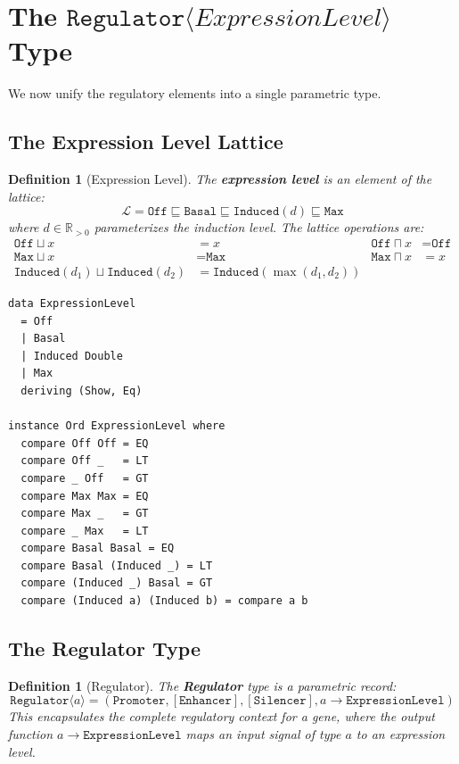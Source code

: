 \documentclass[12pt,a4paper]{article}
\newtheorem{definition}[theorem]{Definition}
\newcommand{\ExprLevel}{\texttt{ExpressionLevel}}
\newcommand{\Reg}[1]{\texttt{Regulator}\ensuremath{\langle}#1\ensuremath{\rangle}}
\begin{document}
\section{The \texorpdfstring{$\Reg{ExpressionLevel}$}{Regulator<ExpressionLevel>} Type}\label{sec:regulator-type}

We now unify the regulatory elements into a single parametric type.

\subsection{The Expression Level Lattice}

\begin{definition}[Expression Level]\label{def:expression-level}
The \textbf{expression level} is an element of the lattice:
\[
\mathcal{L} = \texttt{Off} \sqsubseteq \texttt{Basal} \sqsubseteq \texttt{Induced}(d) \sqsubseteq \texttt{Max}
\]
where $d \in \mathbb{R}_{>0}$ parameterizes the induction level.  The lattice operations are:
\begin{align}
\texttt{Off} \sqcup x &= x & \texttt{Off} \sqcap x &= \texttt{Off} \\
\texttt{Max} \sqcup x &= \texttt{Max} & \texttt{Max} \sqcap x &= x \\
\texttt{Induced}(d_1) \sqcup \texttt{Induced}(d_2) &= \texttt{Induced}(\max(d_1,d_2))
\end{align}
\end{definition}

\begin{lstlisting}[caption={Expression level algebraic data type}]
data ExpressionLevel
  = Off
  | Basal
  | Induced Double
  | Max
  deriving (Show, Eq)

instance Ord ExpressionLevel where
  compare Off Off = EQ
  compare Off _   = LT
  compare _ Off   = GT
  compare Max Max = EQ
  compare Max _   = GT
  compare _ Max   = LT
  compare Basal Basal = EQ
  compare Basal (Induced _) = LT
  compare (Induced _) Basal = GT
  compare (Induced a) (Induced b) = compare a b
\end{lstlisting}

\subsection{The Regulator Type}

\begin{definition}[Regulator]\label{def:regulator}
The \textbf{Regulator} type is a parametric record:
\[
\texttt{Regulator}\langle a \rangle = \left(\texttt{Promoter}, [\texttt{Enhancer}], [\texttt{Silencer}], a \to \ExprLevel\right)
\]
This encapsulates the complete regulatory context for a gene, where the output function $a \to \ExprLevel$ maps an input signal of type $a$ to an expression level.
\end{definition}
\end{document}
